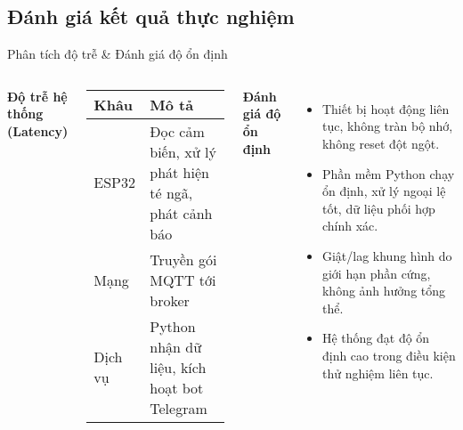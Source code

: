 \subsection{Đánh giá kết quả thực nghiệm}
\begin{frame}{Phân tích độ trễ & Đánh giá độ ổn định}
\begin{columns}[T]
    \textbf{Độ trễ hệ thống (Latency)}
    \begin{tabular}{@{}ll@{}}
    \toprule
    \textbf{Khâu} & \textbf{Mô tả} \\
    \midrule
    ESP32 & Đọc cảm biến, xử lý phát hiện té ngã, phát cảnh báo \\
    Mạng & Truyền gói MQTT tới broker \\
    Dịch vụ & Python nhận dữ liệu, kích hoạt bot Telegram \\
    \bottomrule
    \end{tabular}

    \textbf{Đánh giá độ ổn định}
    \begin{itemize}
        \item Thiết bị hoạt động liên tục, không tràn bộ nhớ, không reset đột ngột.
        \item Phần mềm Python chạy ổn định, xử lý ngoại lệ tốt, dữ liệu phối hợp chính xác.
        \item Giật/lag khung hình do giới hạn phần cứng, không ảnh hưởng tổng thể.
        \item Hệ thống đạt độ ổn định cao trong điều kiện thử nghiệm liên tục.
    \end{itemize}
\end{columns}
\end{frame}
